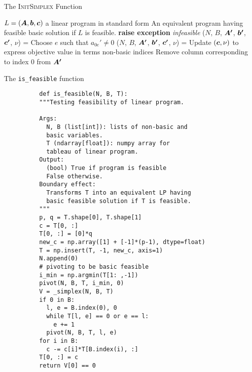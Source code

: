 \documentclass[32pt, aspectratio = 169]{beamer}
\begin{document}
\begin{frame}{The \textsc{InitSimplex} Function}
  \small{
    \begin{algorithmic}[1]
      \Require $L = (\boldsymbol{A}, \boldsymbol{b}, \boldsymbol{c})$ a linear program in standard form
      \Ensure An equivalent program having feasible basic solution if $L$ is feasible.
                \State \textbf{raise exception} \textit{infeasible}
            \Else
                \State ($N$, $B$, $\boldsymbol{A'}$, $\boldsymbol{b'}$, $\boldsymbol{c'}$, $\nu$) = 
                    \State Choose $e$ such that $a_{0e}' \neq 0$
                    \State ($N$, $B$, $\boldsymbol{A'}$, $\boldsymbol{b'}$, $\boldsymbol{c'}$, $\nu$) = 
                \EndIf
                \State Update $(\boldsymbol{c}, \nu)$ to express objective value in terms non-basic indices
                \State Remove column corresponding to index $0$ from $\boldsymbol{A'}$
                \State {}
            \EndIf
        \EndFunction
        \Statex
    \end{algorithmic}
    }
\end{frame}

\begin{frame}[fragile]{The \texttt{is_feasible} function}
  \begin{overlayarea}{1.05\textwidth}{.75\textheight}
    \setlength\columnseprule{.1pt}
    \begin{multicols}{2}
      \scriptsize{
        \begin{verbatim}
          def is_feasible(N, B, T):
          """Testing feasibility of linear program.

          Args:
            N, B (list[int]): lists of non-basic and
            basic variables.
            T (ndarray[float]): numpy array for
            tableau of linear program.
          Output:
            (bool) True if program is feasible
            False otherwise.
          Boundary effect:
            Transforms T into an equivalent LP having
            basic feasible solution if T is feasible.
          """
          p, q = T.shape[0], T.shape[1]
          c = T[0, :]
          T[0, :] = [0]*q
          new_c = np.array([1] + [-1]*(p-1), dtype=float)
          T = np.insert(T, -1, new_c, axis=1)
          N.append(0)
          # pivoting to be basic feasible
          i_min = np.argmin(T[1: ,-1])
          pivot(N, B, T, i_min, 0)
          V = _simplex(N, B, T)
          if 0 in B:
            l, e = B.index(0), 0
            while T[l, e] == 0 or e == l:
              e += 1
            pivot(N, B, T, l, e)
          for i in B:
            c -= c[i]*T[B.index(i), :]
          T[0, :] = c
          return V[0] == 0
      \end{verbatim}
    }
  \end{multicols}
\end{overlayarea}
\end{frame}
\end{document}
